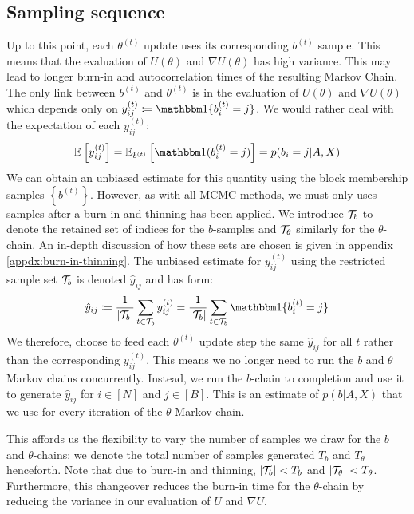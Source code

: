 \subsection{Sampling sequence}

Up to this point, each $\theta^{(t)}$ update uses its corresponding $b^{(t)}$ sample. This means that the evaluation of $U(\theta)$ and $\nabla U(\theta)$ has high variance. This may lead to longer burn-in and autocorrelation times of the resulting Markov Chain. The only link between $b^{(t)}$ and $\theta^{(t)}$ is in the evaluation of $U(\theta)$ and $\nabla U(\theta)$ which depends only on $y_{ij}^{(t)} \coloneqq \one\{b_i^{(t)} = j\}$. We would rather deal with the expectation of each $y_{ij}^{(t)}$:
%
\begin{equation}
	\Expect \left[ y_{ij}^{(t)} \right] = \Expect_{b^{(t)}} \left[ \one(b_{i}^{(t)} = j) \right]
	= p(b_i = j | A, X)
\end{equation}
%
We can obtain an unbiased estimate for this quantity using the block membership samples $\left\{ b^{(t)} \right\}$. However, as with all MCMC methods, we must only uses samples after a burn-in and thinning has been applied. We introduce $\mathcal{T}_b$ to denote the retained set of indices for the $b$-samples and $\mathcal{T}_\theta$ similarly for the $\theta$-chain. An in-depth discussion of how these sets are chosen is given in appendix \ref{appdx:burn-in-thinning}. The unbiased estimate for $y_{ij}^{(t)}$ using the restricted sample set $\mathcal{T}_b$ is denoted $\hat{y}_{ij}$ and has form:
%
\begin{equation}
	\hat{y}_{ij} \coloneqq \frac{1}{|\Tcal_b|} \sum_{t \in \Tcal_b} y_{ij}^{(t)} = \frac{1}{|\Tcal_b|} \sum_{t \in \Tcal_b} \one\{b_i^{(t)} = j\}
\end{equation}
%
We therefore, choose to feed each $\theta^{(t)}$ update step the same $\hat{y}_{ij}$ for all $t$ rather than the corresponding $y^{(t)}_{ij}$. This means we no longer need to run the $b$ and $\theta$ Markov chains concurrently. Instead, we run the $b$-chain to completion and use it to generate $\hat{y}_{ij}$ for $i \in [N]$ and $j \in [B]$. This is an estimate of $p(b | A, X)$ that we use for every iteration of the $\theta$ Markov chain.

This affords us the flexibility to vary the number of samples we draw for the $b$ and $\theta$-chains; we denote the total number of samples generated $T_b$ and $T_\theta$ henceforth. Note that due to burn-in and thinning, $|\mathcal{T}_b| < T_b$ and $|\mathcal{T}_\theta| < T_\theta$. Furthermore, this changeover reduces the burn-in time for the $\theta$-chain by reducing the variance in our evaluation of $U$ and $\nabla U$.

